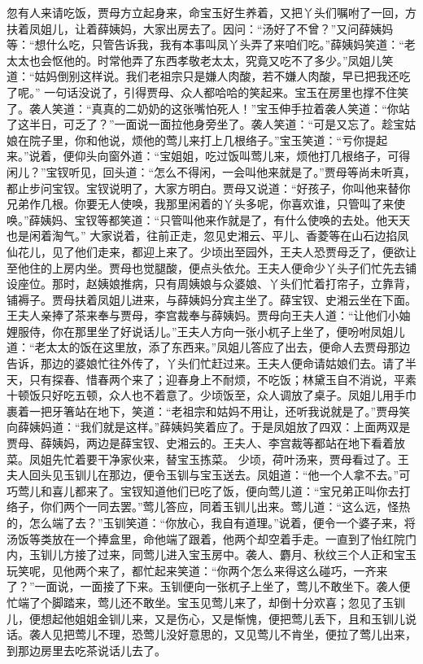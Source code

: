 \documentclass[12pt,oneside]{book}
\begin{document}
忽有人来请吃饭，贾母方立起身来，命宝玉好生养着，又把丫头们嘱咐了一回，方扶着凤姐儿，让着薛姨妈，大家出房去了。因问：“汤好了不曾？”又问薛姨妈等：“想什么吃，只管告诉我，我有本事叫凤丫头弄了来咱们吃。”薛姨妈笑道：“老太太也会怄他的。时常他弄了东西孝敬老太太，究竟又吃不了多少。”凤姐儿笑道：“姑妈倒别这样说。我们老祖宗只是嫌人肉酸，若不嫌人肉酸，早已把我还吃了呢。”
一句话没说了，引得贾母、众人都哈哈的笑起来。宝玉在房里也撑不住笑了。袭人笑道：“真真的二奶奶的这张嘴怕死人！”宝玉伸手拉着袭人笑道：“你站了这半日，可乏了？”一面说一面拉他身旁坐了。袭人笑道：“可是又忘了。趁宝姑娘在院子里，你和他说，烦他的莺儿来打上几根络子。”宝玉笑道：“亏你提起来。”说着，便仰头向窗外道：“宝姐姐，吃过饭叫莺儿来，烦他打几根络子，可得闲儿？”宝钗听见，回头道：“怎么不得闲，一会叫他来就是了。”贾母等尚未听真，都止步问宝钗。宝钗说明了，大家方明白。贾母又说道：“好孩子，你叫他来替你兄弟作几根。你要无人使唤，我那里闲着的丫头多呢，你喜欢谁，只管叫了来使唤。”薛姨妈、宝钗等都笑道：“只管叫他来作就是了，有什么使唤的去处。他天天也是闲着淘气。”
大家说着，往前正走，忽见史湘云、平儿、香菱等在山石边掐凤仙花儿，见了他们走来，都迎上来了。少顷出至园外，王夫人恐贾母乏了，便欲让至他住的上房内坐。贾母也觉腿酸，便点头依允。王夫人便命少丫头子们忙先去铺设座位。那时，赵姨娘推病，只有周姨娘与众婆娘、丫头们忙着打帘子，立靠背，铺褥子。贾母扶着凤姐儿进来，与薛姨妈分宾主坐了。薛宝钗、史湘云坐在下面。王夫人亲捧了茶来奉与贾母，李宫裁奉与薛姨妈。贾母向王夫人道：“让他们小妯娌服侍，你在那里坐了好说话儿。”王夫人方向一张小杌子上坐了，便吩咐凤姐儿道：“老太太的饭在这里放，添了东西来。”凤姐儿答应了出去，便命人去贾母那边告诉，那边的婆娘忙往外传了，丫头们忙赶过来。王夫人便命请姑娘们去。请了半天，只有探春、惜春两个来了；迎春身上不耐烦，不吃饭；林黛玉自不消说，平素十顿饭只好吃五顿，众人也不着意了。少顷饭至，众人调放了桌子。凤姐儿用手巾裹着一把牙箸站在地下，笑道：“老祖宗和姑妈不用让，还听我说就是了。”贾母笑向薛姨妈道：“我们就是这样。”薛姨妈笑着应了。于是凤姐放了四双：上面两双是贾母、薛姨妈，两边是薛宝钗、史湘云的。王夫人、李宫裁等都站在地下看着放菜。凤姐先忙着要干净家伙来，替宝玉拣菜。
少顷，荷叶汤来，贾母看过了。王夫人回头见玉钏儿在那边，便令玉钏与宝玉送去。凤姐道：“他一个人拿不去。”可巧莺儿和喜儿都来了。宝钗知道他们已吃了饭，便向莺儿道：“宝兄弟正叫你去打络子，你们两个一同去罢。”莺儿答应，同着玉钏儿出来。莺儿道：“这么远，怪热的，怎么端了去？”玉钏笑道：“你放心，我自有道理。”说着，便令一个婆子来，将汤饭等类放在一个捧盒里，命他端了跟着，他两个却空着手走。一直到了怡红院门内，玉钏儿方接了过来，同莺儿进入宝玉房中。袭人、麝月、秋纹三个人正和宝玉玩笑呢，见他两个来了，都忙起来笑道：“你两个怎么来得这么碰巧，一齐来了？”一面说，一面接了下来。玉钏便向一张杌子上坐了，莺儿不敢坐下。袭人便忙端了个脚踏来，莺儿还不敢坐。宝玉见莺儿来了，却倒十分欢喜；忽见了玉钏儿，便想起他姐姐金钏儿来，又是伤心，又是惭愧，便把莺儿丢下，且和玉钏儿说话。袭人见把莺儿不理，恐莺儿没好意思的，又见莺儿不肯坐，便拉了莺儿出来，到那边房里去吃茶说话儿去了。
\end{document}
